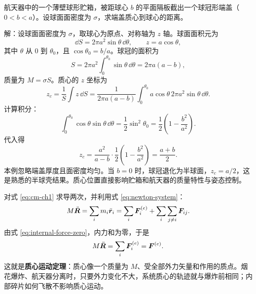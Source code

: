 \begin{example}[球形贮箱球冠端盖的质心]
航天器中的一个薄壁球形贮箱，被距球心 $b$ 的平面隔板截出一个球冠形端盖（$0<b<a$）。设球面面密度为 $\sigma$，求端盖质心到球心的距离。

\begin{center}
\end{center}

解：设球面面密度为 $\sigma$，取球心为原点、对称轴为 $z$ 轴。球面面积元为
\[
\dd S=2\pi a^2\sin\theta\,\dd\theta,\qquad
z=a\cos\theta,
\]
其中 $\theta$ 从 $0$ 到 $\theta_0$，且 $\cos\theta_0=b/a$。球冠的面积为
\[
S=2\pi a^2\int_0^{\theta_0}\sin\theta\,\dd\theta
=2\pi a(a-b),
\]
质量为 $M=\sigma S$。质心的 $z$ 坐标为
\[
z_c=\frac{1}{S}\int z\,\dd S
=\frac{1}{2\pi a(a-b)}
\int_0^{\theta_0}a\cos\theta\,2\pi a^2\sin\theta\,\dd\theta.
\]
计算积分：
\[
\int_0^{\theta_0}\cos\theta\sin\theta\,\dd\theta
=\frac12\sin^2\theta_0
=\frac12\left(1-\frac{b^2}{a^2}\right).
\]
代入得
\[
z_c=\frac{a^2}{a-b}\cdot\frac12\left(1-\frac{b^2}{a^2}\right)
=\frac{a+b}{2}.
\]
本例忽略端盖厚度且面密度均匀。当 $b=0$ 时，球冠退化为半球面，$z_c=a/2$，这是熟悉的半球壳结果。质心位置直接影响贮箱和航天器的质量特性与姿态控制。
\end{example}

对式 \eqref{eq:cm-ch1} 求导两次，并利用式 \eqref{eq:newton-system}：
\begin{equation}
M\ddot{\boldsymbol{R}}
=\sum_i m_i\ddot{\boldsymbol{r}}_i
=\sum_i\boldsymbol{F}_i^{(e)}+\sum_i\sum_{j\ne i}\boldsymbol{F}_{ij}.
\end{equation}
由式 \eqref{eq:internal-force-zero}，内力和为零，于是
\begin{equation}
M\ddot{\boldsymbol{R}}=\sum_i\boldsymbol{F}_i^{(e)}=\boldsymbol{F}^{(e)}.
\label{eq:cm-theorem-ch1}
\end{equation}
这就是\textbf{质心运动定理}：质心像一个质量为 $M$、受全部外力矢量和作用的质点。烟花爆炸、航天器分离时，只要外力变化不大，系统质心的轨迹就与爆炸前相同；内部碎片如何飞散不影响质心运动。

